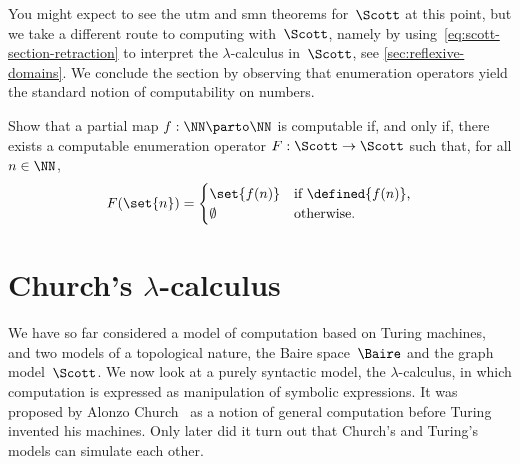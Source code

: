 You might expect to see the utm and smn theorems for~$\Scott$ at this point, but we take a different route to computing with~$\Scott$, namely by using~\eqref{eq:scott-section-retraction} to interpret the $\lambda$-calculus in~$\Scott$, see \cref{sec:reflexive-domains}. We conclude the section by observing that enumeration operators yield the standard notion of computability on numbers.

\begin{exercise}
  Show that a partial map $f : \NN \parto \NN$ is computable if, and only if, there exists a computable enumeration operator $F : \Scott \to \Scott$ such that, for all $n \in \NN$,
  \begin{equation*}
    F(\set{n}) =
    \begin{cases}
      \set{f(n)} & \text{if $\defined{f(n)}$,} \\
      \emptyset & \text{otherwise.}
    \end{cases}
  \end{equation*}
\end{exercise}


\section[\texorpdfstring%
{Church's $\lambda$-calculus}%
{Church's lambda-calculus}%
]{Church's $\lambda$-calculus}
\label{sec:lambda-calculus}

We have so far considered a model of computation based on Turing
machines, and two models of a topological nature, the Baire
space~$\Baire$ and the graph model~$\Scott$. We now look at a purely
syntactic model, the $\lambda$-calculus, in which computation is expressed as manipulation of
symbolic expressions.
It was proposed by Alonzo Church~ as a
notion of general computation before Turing invented his machines. Only later did it turn out that Church's and Turing's models can simulate each other.

